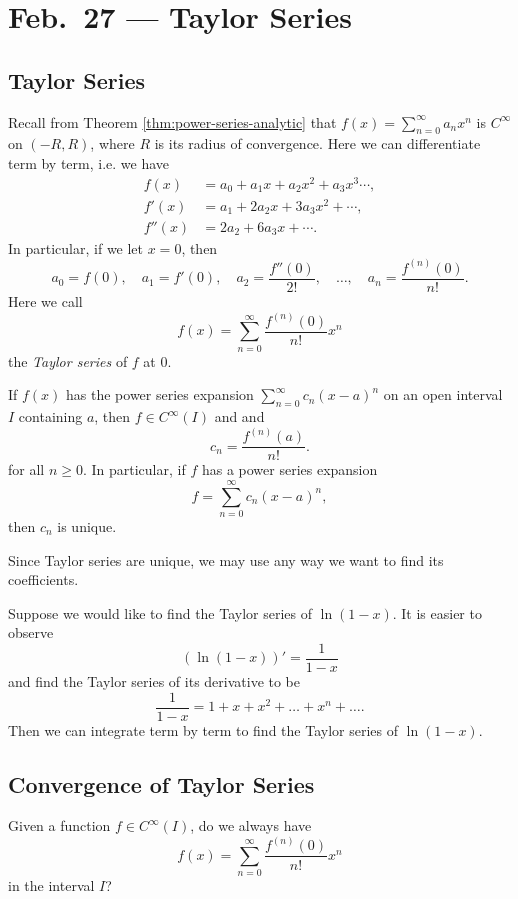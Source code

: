 \chapter{Feb.~27 --- Taylor Series}

\section{Taylor Series}

Recall from Theorem \ref{thm:power-series-analytic} that $f(x) = \sum_{n = 0}^\infty a_n x^n$
is $C^\infty$ on $(-R, R)$, where $R$ is its radius
of convergence. Here we can differentiate term by term,
i.e. we have
\begin{align*}
  f(x) &= a_0 + a_1 x + a_2 x^2 + a_3 x^3 \cdots, \\
  f'(x) &= a_1 + 2a_2 x + 3a_3 x^2 + \cdots, \\
  f''(x) &= 2a_2 + 6a_3 x + \cdots.
\end{align*}
In particular, if we let $x = 0$, then
\[a_0 = f(0), \quad a_1 = f'(0), \quad a_2 = \frac{f''(0)}{2!}, \quad \dots, \quad a_n = \frac{f^{(n)}(0)}{n!}.\]
Here we call
\[
  f(x) = \sum_{n = 0}^\infty \frac{f^{(n)}(0)}{n!} x^n
\]
the \emph{Taylor series} of $f$ at $0$.

\begin{corollary}
  If $f(x)$ has the power series expansion
  $\sum_{n = 0}^\infty c_n (x - a)^n$ on an open interval
  $I$ containing $a$, then $f \in C^\infty(I)$ and
  and
  \[
    c_n = \frac{f^{(n)}(a)}{n!}.
  \]
  for all $n \ge 0$. In particular, if $f$ has a power
  series expansion
  \[
    f = \sum_{n = 0}^\infty c_n (x - a)^n,
  \]
  then $c_n$ is unique.
\end{corollary}

\begin{remark}
  Since Taylor series are unique, we may use any
  way we want to find its coefficients.
\end{remark}

\begin{example}
  Suppose we would like to find the Taylor series of
  $\ln(1 - x)$. It is easier to observe
  \[
    (\ln(1 - x))' = \frac{1}{1 - x}
  \]
  and find the Taylor series of its derivative to be
  \[
    \frac{1}{1 - x} = 1 + x + x^2 + \dots + x^n + \dots.
  \]
  Then we can integrate term by term to find
  the Taylor series of $\ln(1 - x)$.
\end{example}

\section{Convergence of Taylor Series}
Given a function $f \in C^\infty(I)$, do we always have
\[
  f(x) = \sum_{n = 0}^\infty \frac{f^{(n)}(0)}{n!} x^n
\]
in the interval $I$?

